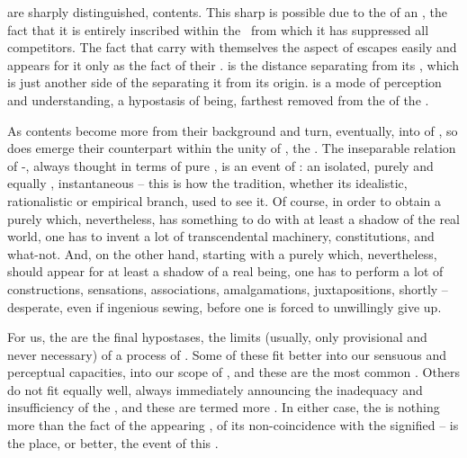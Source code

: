 \pa {} are sharply distinguished,  contents.  This
sharp  is possible due to the  of an ,
the fact that it is entirely inscribed within the \hoa\ from which it has
suppressed all competitors.  The fact that  carry with themselves the
aspect of  escapes easily  and appears for it
only as the fact of their .   is the distance
separating  from its , which is just another side of
the  separating it from its origin.   is a mode of
perception and understanding, a hypostasis of being, farthest removed from the
 of the  .

\pa
As contents become more   from their background
and turn, eventually, into  of , so does
emerge their counterpart within the unity of \hoa, the  .
The inseparable relation of -, always thought in terms of
pure , is an event of : an isolated, purely
  and equally , instantaneous  --
this is how the tradition, whether its idealistic, rationalistic or empirical
branch, used to see it.  Of course, in order to obtain a purely 
 which, nevertheless, has something to do with at least a shadow of
the real world, one has to invent a lot of transcendental machinery,
constitutions, and what-not.  And, on the other hand, starting with a purely
  which, nevertheless, should appear for at least a
shadow of a real being, one has to perform a lot of constructions, sensations,
associations, amalgamations, juxtapositions, shortly -- desperate, even if
ingenious sewing, before one is forced to unwillingly give up.

For us, the  are the final hypostases, the  limits
(usually, only provisional and never necessary) of a process of
.  Some of these  fit
better into our sensuous and perceptual capacities, into our scope of \hoa, and
these are the most common .  Others do not fit equally well, always
immediately announcing the inadequacy and insufficiency of the , and these are termed more .  In either case,
the   is nothing more than the fact of the  appearing , of its non-coincidence with the signified
 --  is the place, or better, the event of
this .

